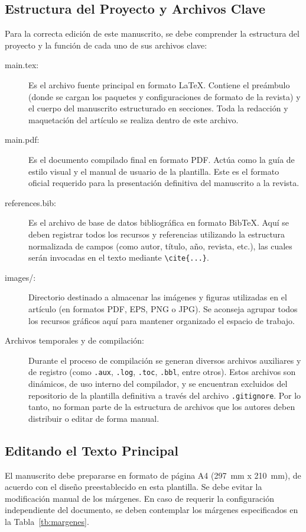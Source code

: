 \documentclass[a4paper, 12pt]{article}
\begin{document}
\subsection{Estructura del Proyecto y Archivos Clave}

Para la correcta edición de este manuscrito, se debe comprender la estructura del proyecto y la función de cada uno de sus archivos clave:
\begin{description}
  \item[main.tex:] Es el archivo fuente principal en formato \LaTeX{}. Contiene el preámbulo (donde se cargan los paquetes y configuraciones de formato de la revista) y el cuerpo del manuscrito estructurado en secciones. Toda la redacción y maquetación del artículo se realiza dentro de este archivo.
  \item[main.pdf:] Es el documento compilado final en formato PDF. Actúa como la guía de estilo visual y el manual de usuario de la plantilla. Este es el formato oficial requerido para la presentación definitiva del manuscrito a la revista.
  \item[references.bib:] Es el archivo de base de datos bibliográfica en formato BibTeX. Aquí se deben registrar todos los recursos y referencias utilizando la estructura normalizada de campos (como autor, título, año, revista, etc.), las cuales serán invocadas en el texto mediante \texttt{\textbackslash cite\{...\}}.
  \item[images/:] Directorio destinado a almacenar las imágenes y figuras utilizadas en el artículo (en formatos PDF, EPS, PNG o JPG). Se aconseja agrupar todos los recursos gráficos aquí para mantener organizado el espacio de trabajo.
  \item[Archivos temporales y de compilación:] Durante el proceso de compilación se generan diversos archivos auxiliares y de registro (como \texttt{.aux}, \texttt{.log}, \texttt{.toc}, \texttt{.bbl}, entre otros). Estos archivos son dinámicos, de uso interno del compilador, y se encuentran excluidos del repositorio de la plantilla definitiva a través del archivo \texttt{.gitignore}. Por lo tanto, no forman parte de la estructura de archivos que los autores deben distribuir o editar de forma manual.
\end{description}

\subsection{Editando el Texto Principal}

El manuscrito debe prepararse en formato de página A4 (\qty{297}{\milli\meter} x
\qty{210}{\milli\meter}), de acuerdo con el diseño preestablecido en esta plantilla. Se debe
evitar la modificación manual de los márgenes. En caso de requerir la configuración independiente
del documento, se deben contemplar los márgenes especificados en la Tabla~\ref{tb:margenes}.
\end{document}

